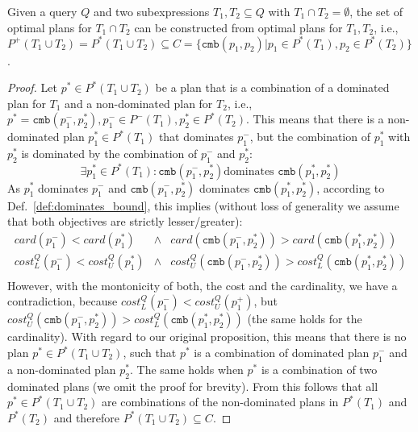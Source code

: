 \begin{theorem}
  Given a query $Q$ and two subexpressions $T_1,T_2 \subseteq Q$ with
  $T_1 \cap T_2 = \emptyset$, the set of optimal plans for $T_1 \cap
  T_2$ can be constructed from optimal plans for $T_1,T_2$, i.e.,
  $P^+(T_1 \cup T_2) = P^*(T_1 \cup T_2) \subseteq C =
  \{\mathtt{cmb}(p_1,p_2) | p_1 \in P^*(T_1), p_2 \in P^*(T_2)\}$.
\end{theorem}
\begin{proof}
  Let $p^* \in P^*(T_1 \cup T_2)$ be a plan that is a combination of a
  dominated plan for $T_1$ and a non-dominated plan for $T_2$, i.e.,
  $p^* = \mathtt{cmb}(p^-_1,p^*_2),p^-_1 \in P^-(T_1),p^*_2 \in
  P^*(T_2)$. This means that there is a non-dominated plan $p^*_1 \in
  P^*(T_1)$ that dominates $p^-_1$, but the combination of $p^*_1$
  with $p^*_2$ is dominated by the combination of $p^-_1$ and $p^*_2$:
  \[ \exists p^*_1 \in P^*(T_1) : \mathtt{cmb}(p^-_1,p^*_2) \text{
    dominates } \mathtt{cmb}(p^*_1,p^*_2)\] As $p^*_1$ dominates
  $p^-_1$ and $\mathtt{cmb}(p^-_1,p^*_2)$ dominates
  $\mathtt{cmb}(p^*_1,p^*_2)$, according to
  Def.~\ref{def:dominates_bound}, this implies (without loss of
  generality we assume that both objectives are strictly
  lesser/greater):
  \begin{eqnarray*}
    card(p^-_1) < card(p^*_1) &\wedge& card (\mathtt{cmb}(p^-_1,p^*_2)) > card(\mathtt{cmb}(p^*_1,p^*_2)) \\
    cost^Q_L(p^-_1) < cost^Q_U(p^*_1) &\wedge& cost^Q_U(\mathtt{cmb}(p^-_1,p^*_2)) > cost^Q_L(\mathtt{cmb}(p^*_1,p^*_2))\\
  \end{eqnarray*}
  However, with the montonicity of both, the cost and the cardinality,
  we have a contradiction, because $cost^Q_L(p^-_1) <
  cost^Q_U(p^+_1)$, but $cost^Q_U(\mathtt{cmb}(p^-_1,p^*_2)) >
  cost^Q_L(\mathtt{cmb}(p^*_1,p^*_2))$ (the same holds for the
  cardinality). With regard to our original proposition, this means
  that there is no plan $p^* \in P^*(T_1 \cup T_2)$, such that $p^*$
  is a combination of dominated plan $p^-_1$ and a non-dominated plan
  $p^*_2$. The same holds when $p^*$ is a combination of two dominated
  plans (we omit the proof for brevity). From this follows that all
  $p^* \in P^*(T_1 \cup T_2)$ are combinations of the non-dominated
  plans in $P^*(T_1)$ and $P^*(T_2)$ and therefore $P^*(T_1 \cup T_2)
  \subseteq C$.
\end{proof}


